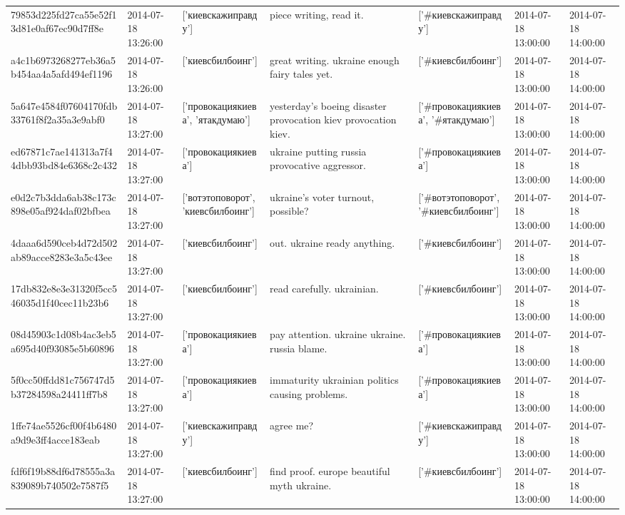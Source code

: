 \begin{tabular}{lllllll}
79853d225fd27ca55e52f13d81e0af67ec90d7ff8e & 2014-07-18 13:26:00 & ['киевскажиправду'] & piece writing, read it. & ['#киевскажиправду'] & 2014-07-18 13:00:00 & 2014-07-18 14:00:00 \\
a4c1b6973268277eb36a5b454aa4a5afd494ef1196 & 2014-07-18 13:26:00 & ['киевсбилбоинг'] & great writing. ukraine enough fairy tales yet. & ['#киевсбилбоинг'] & 2014-07-18 13:00:00 & 2014-07-18 14:00:00 \\
5a647e4584f07604170fdb33761f8f2a35a3e9abf0 & 2014-07-18 13:27:00 & ['провокациякиева', 'ятакдумаю'] & yesterday's boeing disaster provocation kiev provocation kiev. & ['#провокациякиева', '#ятакдумаю'] & 2014-07-18 13:00:00 & 2014-07-18 14:00:00 \\
ed67871c7ae141313a7f44dbb93bd84e6368c2c432 & 2014-07-18 13:27:00 & ['провокациякиева'] & ukraine putting russia provocative aggressor. & ['#провокациякиева'] & 2014-07-18 13:00:00 & 2014-07-18 14:00:00 \\
e0d2c7b3dda6ab38c173c898e05af924daf02bfbea & 2014-07-18 13:27:00 & ['вотэтоповорот', 'киевсбилбоинг'] & ukraine's voter turnout, possible? & ['#вотэтоповорот', '#киевсбилбоинг'] & 2014-07-18 13:00:00 & 2014-07-18 14:00:00 \\
4daaa6d590ceb4d72d502ab89acce8283e3a5c43ee & 2014-07-18 13:27:00 & ['киевсбилбоинг'] & out. ukraine ready anything. & ['#киевсбилбоинг'] & 2014-07-18 13:00:00 & 2014-07-18 14:00:00 \\
17db832e8e3e31320f5cc546035d1f40cec11b23b6 & 2014-07-18 13:27:00 & ['киевсбилбоинг'] & read carefully. ukrainian. & ['#киевсбилбоинг'] & 2014-07-18 13:00:00 & 2014-07-18 14:00:00 \\
08d45903c1d08b4ac3eb5a695d40f93085e5b60896 & 2014-07-18 13:27:00 & ['провокациякиева'] & pay attention. ukraine ukraine. russia blame. & ['#провокациякиева'] & 2014-07-18 13:00:00 & 2014-07-18 14:00:00 \\
5f0cc50ffdd81c756747d5b37284598a24411ff7b8 & 2014-07-18 13:27:00 & ['провокациякиева'] & immaturity ukrainian politics causing problems. & ['#провокациякиева'] & 2014-07-18 13:00:00 & 2014-07-18 14:00:00 \\
1ffe74ae5526cf00f4b6480a9d9e3ff4acce183eab & 2014-07-18 13:27:00 & ['киевскажиправду'] & agree me? & ['#киевскажиправду'] & 2014-07-18 13:00:00 & 2014-07-18 14:00:00 \\
fdf6f19b88df6d78555a3a839089b740502e7587f5 & 2014-07-18 13:27:00 & ['киевсбилбоинг'] & find proof. europe beautiful myth ukraine. & ['#киевсбилбоинг'] & 2014-07-18 13:00:00 & 2014-07-18 14:00:00 \\

\end{tabular}
